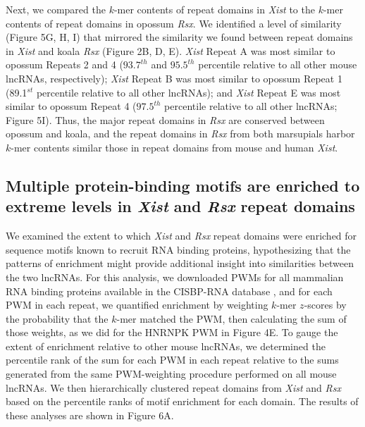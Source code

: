 Next, we compared the $k$-mer contents of repeat domains in \emph{Xist} to the $k$-mer contents of repeat domains in opossum \emph{Rsx}. We identified a level of similarity (Figure 5G, H, I) that mirrored the similarity we found between repeat domains in \emph{Xist} and koala \emph{Rsx} (Figure 2B, D, E). \emph{Xist} Repeat A was most similar to opossum Repeats 2 and 4 ($93.7^{th}$ and $95.5^{th}$ percentile relative to all other mouse lncRNAs, respectively); \emph{Xist} Repeat B was most similar to opossum Repeat 1 (89.1$^{st}$ percentile relative to all other lncRNAs); and \emph{Xist} Repeat E was most similar to opossum Repeat 4 ($97.5^{th}$ percentile relative to all other lncRNAs; Figure 5I). Thus, the major repeat domains in \emph{Rsx} are conserved between opossum and koala, and the repeat domains in \emph{Rsx} from both marsupials harbor $k$-mer contents similar those in repeat domains from mouse and human \emph{Xist}.

\subsection{Multiple protein-binding motifs are enriched to extreme levels in \emph{Xist} and \emph{Rsx} repeat domains}
We examined the extent to which \emph{Xist} and \emph{Rsx} repeat domains were enriched for sequence motifs known to recruit RNA binding proteins, hypothesizing that the patterns of enrichment might provide additional insight into similarities between the two lncRNAs. For this analysis, we downloaded PWMs for all mammalian RNA binding proteins available in the CISBP-RNA database \cite{Ray2013ARegulation}, and for each PWM in each repeat, we quantified enrichment by weighting $k$-mer $z$-scores by the probability that the $k$-mer matched the PWM, then calculating the sum of those weights, as we did for the HNRNPK PWM in Figure 4E. To gauge the extent of enrichment relative to other mouse lncRNAs, we determined the percentile rank of the sum for each PWM in each repeat relative to the sums generated from the same PWM-weighting procedure performed on all mouse lncRNAs. We then hierarchically clustered repeat domains from \emph{Xist} and \emph{Rsx} based on the percentile ranks of motif enrichment for each domain. The results of these analyses are shown in Figure 6A.

